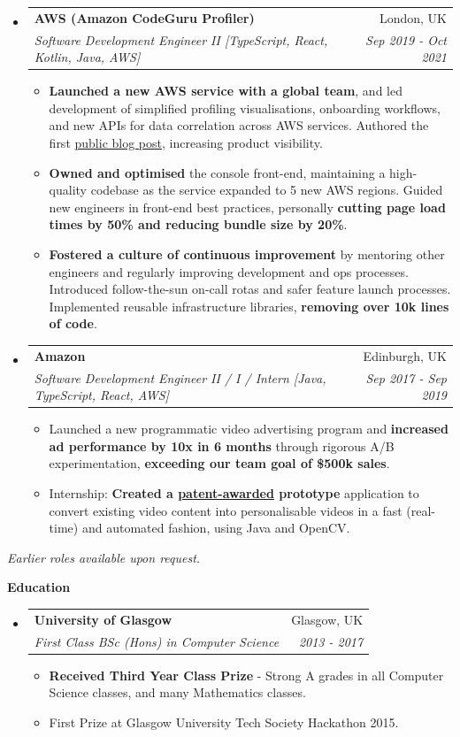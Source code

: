\documentclass[letterpaper,11pt]{article}
\makeatletter
\newcommand{\resitem}[1]{\item #1 \vspace{-1pt}}
\newcommand{\resheading}[1]{{\large \colorbox{mygrey}{\begin{minipage}{\textwidth}{\textbf{#1 \vphantom{p\^{E}}}}\end{minipage}}}}
\newcommand{\ressubheading}[4]{
\begin{tabular*}{7.0in}{l@{\extracolsep{\fill}}r}
	\textbf{#1} & #2 \\
	\textit{#3} & \textit{#4} \\
\end{tabular*}\vspace{-6pt}}
\makeatother
\begin{document}
\begin{itemize}
	\item
	\ressubheading{AWS (Amazon CodeGuru Profiler)}{London, UK}{Software Development Engineer II [TypeScript, React, Kotlin, Java, AWS]}{Sep 2019 - Oct 2021}
	\begin{itemize}
		\resitem{\textbf{Launched a new AWS service with a global team}, and led development of simplified profiling visualisations, onboarding workflows, and new APIs for data correlation across AWS services. Authored the first \href{https://aws.amazon.com/blogs/machine-learning/optimizing-application-performance-with-amazon-codeguru-profiler/}{public blog post}, increasing product visibility.}
		\resitem{\textbf{Owned and optimised} the console front-end, maintaining a high-quality codebase as the service expanded to 5 new AWS regions. Guided new engineers in front-end best practices, personally \textbf{cutting page load times by 50\% and reducing bundle size by 20\%}.}
		\resitem{\textbf{Fostered a culture of continuous improvement} by mentoring other engineers and regularly improving development and ops processes. Introduced follow-the-sun on-call rotas and safer feature launch processes. Implemented reusable infrastructure libraries, \textbf{removing over 10k lines of code}.}
	\end{itemize}

	\item
	\ressubheading{Amazon}{Edinburgh, UK}{Software Development Engineer II / I / Intern [Java, TypeScript, React, AWS]}{Sep 2017 - Sep 2019}
	\begin{itemize}
		\resitem{Launched a new programmatic video advertising program and \textbf{increased ad performance by 10x in 6 months} through rigorous A/B experimentation, \textbf{exceeding our team goal of \$500k sales}.}
		\resitem{Internship: \textbf{Created a \href{https://pdfpiw.uspto.gov/.piw?PageNum=0&docid=10297026&IDKey=E3B5AD2132FF&HomeUrl=\%2F\%2Fpatft.uspto.gov\%2Fnetahtml\%2FPTO\%2Fpatimg.htm}{patent-awarded} prototype} application to convert existing video content into personalisable videos in a fast (real-time)
		and automated fashion, using Java and OpenCV.}
	\end{itemize}

\end{itemize}

\vspace{0.1in}
\textit{Earlier roles available upon request.}

\pagebreak

\resheading{Education}
\begin{itemize}
	\item
	\ressubheading{University of Glasgow}{Glasgow, UK}{First Class BSc (Hons) in Computer Science}{2013 - 2017}
	\begin{itemize}
		\resitem{\textbf{Received Third Year Class Prize} - Strong A grades in all Computer Science classes, and many Mathematics classes.}
		\resitem{First Prize at Glasgow University Tech Society Hackathon 2015.}
	\end{itemize}
\end{itemize}
\end{document}
